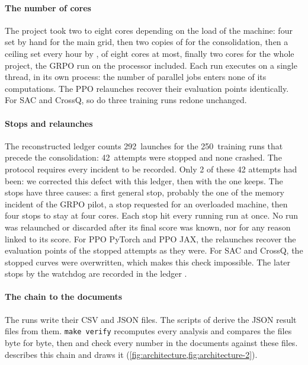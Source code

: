 \paragraph{The number of cores}
The project took two to eight cores depending on the load of the machine: four set by hand for the main
grid, then two copies of  for the consolidation, then a ceiling set every hour by
, of eight cores at most, finally two cores for the whole project, the GRPO run on the
processor included. Each run executes on a single thread,
in its own process: the number of parallel jobs enters none of its computations. The PPO relaunches recover
their evaluation points identically. For SAC and CrossQ, so do three training runs redone unchanged.

\paragraph{Stops and relaunches}
The reconstructed ledger  counts 292~launches for the
250~training runs that precede the consolidation: 42~attempts were stopped and none crashed. The protocol
requires every incident to be recorded. Only 2 of these 42 attempts had been: we corrected this defect with
this ledger, then with the one  keeps. The stops have three causes: a first general stop, probably the one of the
memory incident of the GRPO pilot, a stop requested for an overloaded machine, then four stops
to stay at four cores. Each stop hit every running run at once. No run was relaunched or discarded after its
final score was known, nor for any reason linked to its score. For PPO PyTorch and PPO JAX, the relaunches
recover the evaluation points of the stopped attempts as they were. For SAC and CrossQ, the stopped curves were
overwritten, which makes this check impossible. The later stops by the watchdog
are recorded in the ledger .

\paragraph{The chain to the documents}
The runs write their CSV and JSON files. The scripts of  derive the JSON result files from
them. \texttt{make verify} recomputes every analysis and compares the files byte for byte, then
 and  check every number in the documents against
these files.  describes this chain and draws it (\cref{fig:architecture,fig:architecture-2}).
